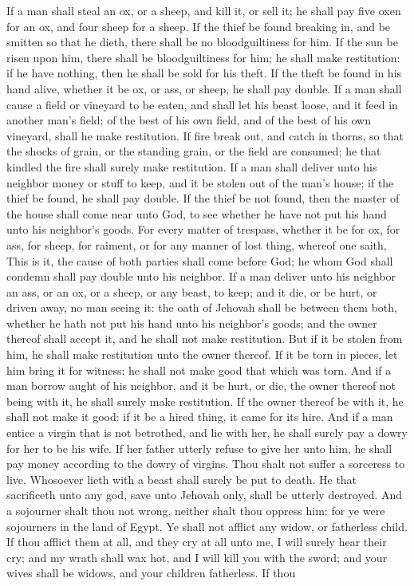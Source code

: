 If a man shall steal an ox, or a sheep, and kill it, or sell it; he shall pay five oxen for an ox, and four sheep for a sheep. If the thief be found breaking in, and be smitten so that he dieth, there shall be no bloodguiltiness for him. If the sun be risen upon him, there shall be bloodguiltiness for him; he shall make restitution: if he have nothing, then he shall be sold for his theft. If the theft be found in his hand alive, whether it be ox, or ass, or sheep, he shall pay double.  If a man shall cause a field or vineyard to be eaten, and shall let his beast loose, and it feed in another man’s field; of the best of his own field, and of the best of his own vineyard, shall he make restitution.  If fire break out, and catch in thorns, so that the shocks of grain, or the standing grain, or the field are consumed; he that kindled the fire shall surely make restitution.  If a man shall deliver unto his neighbor money or stuff to keep, and it be stolen out of the man’s house; if the thief be found, he shall pay double. If the thief be not found, then the master of the house shall come near unto God, to see whether he have not put his hand unto his neighbor’s goods. For every matter of trespass, whether it be for ox, for ass, for sheep, for raiment, or for any manner of lost thing, whereof one saith, This is it, the cause of both parties shall come before God; he whom God shall condemn shall pay double unto his neighbor.  If a man deliver unto his neighbor an ass, or an ox, or a sheep, or any beast, to keep; and it die, or be hurt, or driven away, no man seeing it: the oath of Jehovah shall be between them both, whether he hath not put his hand unto his neighbor’s goods; and the owner thereof shall accept it, and he shall not make restitution. But if it be stolen from him, he shall make restitution unto the owner thereof. If it be torn in pieces, let him bring it for witness: he shall not make good that which was torn.  And if a man borrow aught of his neighbor, and it be hurt, or die, the owner thereof not being with it, he shall surely make restitution. If the owner thereof be with it, he shall not make it good: if it be a hired thing, it came for its hire.  And if a man entice a virgin that is not betrothed, and lie with her, he shall surely pay a dowry for her to be his wife. If her father utterly refuse to give her unto him, he shall pay money according to the dowry of virgins.  Thou shalt not suffer a sorceress to live.  Whosoever lieth with a beast shall surely be put to death.  He that sacrificeth unto any god, save unto Jehovah only, shall be utterly destroyed. And a sojourner shalt thou not wrong, neither shalt thou oppress him: for ye were sojourners in the land of Egypt. Ye shall not afflict any widow, or fatherless child. If thou afflict them at all, and they cry at all unto me, I will surely hear their cry; and my wrath shall wax hot, and I will kill you with the sword; and your wives shall be widows, and your children fatherless.  If thou 